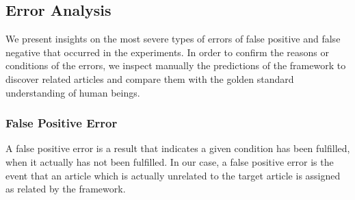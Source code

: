 \subsection{Error Analysis}
\label{sec:5.5}

We present insights on the most severe types of errors of false positive and false negative that occurred in the experiments. In order to confirm the reasons or conditions of the errors, we inspect manually the predictions of the framework to discover related articles and compare them with the golden standard understanding of human beings.  

\subsubsection{False Positive Error}

A false positive error is a result that indicates a given condition has been fulfilled, when it actually has not been fulfilled. In our case, a false positive error is the event that an article which is actually unrelated to the target article is assigned as related by the framework. 

